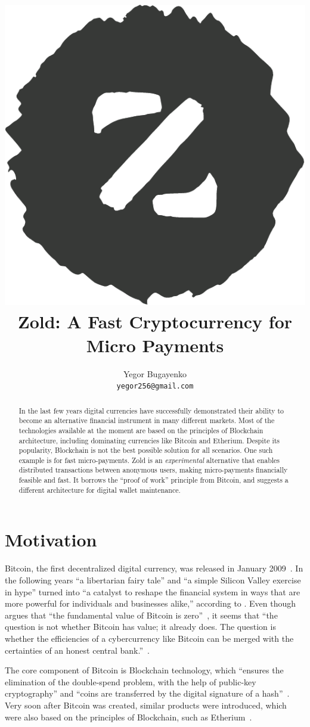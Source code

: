 \documentclass[11pt,oneside]{article}
\title{\includegraphics[scale=0.3]{../images/logo.pdf}\\Zold: A Fast Cryptocurrency for Micro Payments}
\author{Yegor Bugayenko\\\texttt{yegor256@gmail.com}\\[1em]\href{https://github.com/zold-io/papers/releases/tag/\zoldversion}{\texttt{\zoldversion}}}
\begin{document}
\raggedbottom

\maketitle
\begin{abstract}
In the last few years digital currencies have successfully demonstrated
their ability to become an alternative financial instrument in many
different markets. Most of the technologies available at the moment are
based on the principles of Blockchain architecture, including
dominating currencies like Bitcoin and Etherium. Despite its
popularity, Blockchain is not the best possible solution for all scenarios.
One such example is for fast micro-payments.
Zold is an \emph{experimental} alternative that enables distributed transactions between
anonymous users, making micro-payments financially feasible and fast.
It borrows the ``proof of work'' principle from Bitcoin,
and suggests a different architecture for digital wallet maintenance.
\end{abstract}

\section{Motivation}

Bitcoin, the first decentralized digital currency, was released in January 2009~\parencite{nakamoto2008}.
In the following years ``a libertarian fairy tale'' and ``a simple Silicon Valley exercise in hype''
turned into ``a catalyst to reshape the financial system in ways that are more
powerful for individuals and businesses alike,'' according to \textcite{andreessen2014}.
Even though \textcite{cheah2015} argues that
``the fundamental value of Bitcoin is zero''~,
it seems that ``the question is not whether Bitcoin has value; it already does.
The question is whether the efficiencies of a cybercurrency
like Bitcoin can be merged with the certainties of an honest central bank.''~\parencite{van2014}.

The core component of Bitcoin is Blockchain technology, which
``ensures the elimination of the double-spend problem, with the help
of public-key cryptography'' and ``coins are transferred by the
digital signature of a hash''~\parencite{pilkington2016}.
Very soon after Bitcoin was created, similar products were introduced,
which were also based on the principles of Blockchain, such as
Etherium~\parencite{buterin2013}.
\end{document}

